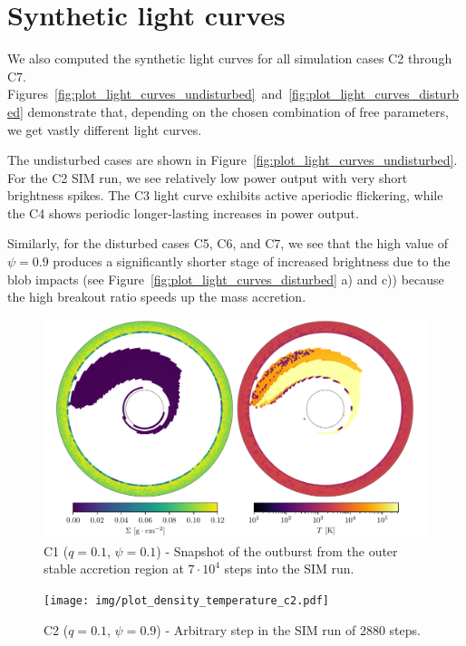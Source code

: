 \section{Synthetic light curves}
    We also computed the synthetic light curves for all simulation cases C2 through C7. Figures~\ref{fig:plot_light_curves_undisturbed}~and~\ref{fig:plot_light_curves_disturbed} demonstrate that, depending on the chosen combination of free parameters, we get vastly different light curves. 

    The undisturbed cases are shown in Figure~\ref{fig:plot_light_curves_undisturbed}. For the C2 SIM run, we see relatively low power output with very short brightness spikes. The C3 light curve exhibits active aperiodic flickering, while the C4 shows periodic longer-lasting increases in power output. 

    Similarly, for the disturbed cases C5, C6, and C7, we see that the high value of $\psi = 0.9$ produces a significantly shorter stage of increased brightness due to the blob impacts (see Figure~\ref{fig:plot_light_curves_disturbed} a) and c)) because the high breakout ratio speeds up the mass accretion. 

    \begin{figure}
        \includegraphics[width=1.0\columnwidth]{img/plot_density_temperature_c1.pdf}
        \caption{C1 ($q = 0.1$, $\psi = 0.1$) - Snapshot of the outburst from the outer stable accretion region at $7 \cdot 10^4$ steps into the SIM run.}
        \label{fig:plot_density_temperature_c1}
    \end{figure}

    \begin{figure}
        \texttt{[image: img/plot\_density\_temperature\_c2.pdf]}
        \caption{C2 ($q = 0.1$, $\psi = 0.9$) - Arbitrary step in the SIM run of 2880 steps.}
        \label{fig:plot_density_temperature_c2}
    \end{figure}

